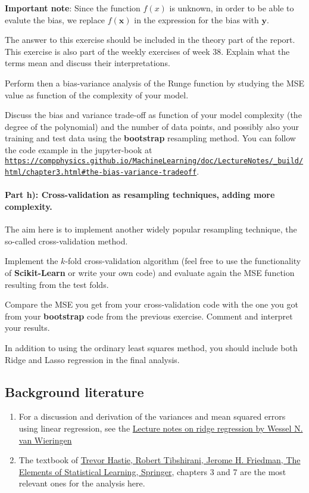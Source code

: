 \documentclass[%
oneside,                 %
final,                   %
10pt]{article}
\begin{document}
\textbf{Important note}: Since the function $f(x)$ is unknown, in order to be able to evalute the bias, we replace $f(\bm{x})$ in the expression for the bias with $\bm{y}$. 

The answer to this exercise should be included in the theory part of
the report.  This exercise is also part of the weekly exercises of
week 38.  Explain what the terms mean and discuss their
interpretations.

Perform then a bias-variance analysis of the Runge function by
studying the MSE value as function of the complexity of your model.

Discuss the bias and variance trade-off as function
of your model complexity (the degree of the polynomial) and the number
of data points, and possibly also your training and test data using the \textbf{bootstrap} resampling method.
You can follow the code example in the jupyter-book at \href{{https://compphysics.github.io/MachineLearning/doc/LectureNotes/_build/html/chapter3.html#the-bias-variance-tradeoff}}{\nolinkurl{https://compphysics.github.io/MachineLearning/doc/LectureNotes/_build/html/chapter3.html\#the-bias-variance-tradeoff}}.

\paragraph{Part h):  Cross-validation as resampling techniques, adding more complexity.}
The aim here is to implement another widely popular
resampling technique, the so-called cross-validation method.  

Implement the $k$-fold cross-validation algorithm (feel free to use
the functionality of \textbf{Scikit-Learn} or write your own code) and
evaluate again the MSE function resulting from the test folds.

Compare the MSE you get from your cross-validation code with the one
you got from your \textbf{bootstrap} code from the previous exercise. Comment and interpret your results. 

In addition to using the ordinary least squares method, you should
include both Ridge and Lasso regression in the final analysis.

\subsection{Background literature}

\begin{enumerate}
\item For a discussion and derivation of the variances and mean squared errors using linear regression, see the \href{{https://arxiv.org/abs/1509.09169}}{Lecture notes on ridge regression by Wessel N. van Wieringen}

\item The textbook of \href{{https://www.springer.com/gp/book/9780387848570}}{Trevor Hastie, Robert Tibshirani, Jerome H. Friedman, The Elements of Statistical Learning, Springer}, chapters 3 and 7 are the most relevant ones for the analysis here. 
\end{enumerate}
\end{document}
